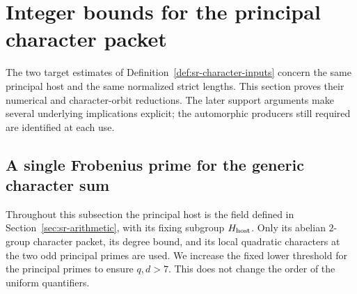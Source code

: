 \section{Integer bounds for the principal character packet}
\label{sec:sr-character-integers}
The two target estimates of Definition~\ref{def:sr-character-inputs}
concern the same principal host and the same normalized strict lengths.
This section proves their numerical and character-orbit reductions.
The later support arguments make several underlying implications
explicit; the automorphic producers still required are identified at
each use.

\subsection{A single Frobenius prime for the generic character sum}
\label{sec:sr-fixed-seven-generic}
Throughout this subsection the principal host is the field defined in
Section~\ref{sec:sr-arithmetic}, with its fixing subgroup $H_{\rm host}$.
Only its abelian $2$-group character packet, its degree bound, and its
local quadratic characters at the two odd principal primes are used.
We increase the fixed lower threshold for the principal primes to ensure
$q,d>7$. This does not change the order of the uniform quantifiers.

